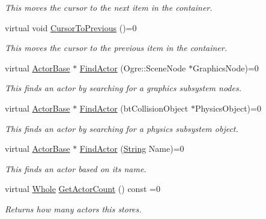 \begin{DoxyCompactItemize}
\begin{DoxyCompactList}\small\item\em This moves the cursor to the next item in the container. \item\end{DoxyCompactList}\item 
virtual void \hyperlink{classMezzanine_1_1ActorContainerBase_a43c40059dc0c99742e99efa68c1acf52}{CursorToPrevious} ()=0
\begin{DoxyCompactList}\small\item\em This moves the cursor to the previous item in the container. \item\end{DoxyCompactList}\item 
virtual \hyperlink{classMezzanine_1_1ActorBase}{ActorBase} $\ast$ \hyperlink{classMezzanine_1_1ActorContainerBase_ace7273ccf53bc37cca7defbd703880f9}{FindActor} (Ogre::SceneNode $\ast$GraphicsNode)=0
\begin{DoxyCompactList}\small\item\em This finds an actor by searching for a graphics subsystem nodes. \item\end{DoxyCompactList}\item 
virtual \hyperlink{classMezzanine_1_1ActorBase}{ActorBase} $\ast$ \hyperlink{classMezzanine_1_1ActorContainerBase_a405caa151d3556786344be12ac0b6c2a}{FindActor} (btCollisionObject $\ast$PhysicsObject)=0
\begin{DoxyCompactList}\small\item\em This finds an actor by searching for a physics subsystem object. \item\end{DoxyCompactList}\item 
virtual \hyperlink{classMezzanine_1_1ActorBase}{ActorBase} $\ast$ \hyperlink{classMezzanine_1_1ActorContainerBase_aafa4b056aaa0161d3d814bfb56bd9ae9}{FindActor} (\hyperlink{namespaceMezzanine_acf9fcc130e6ebf08e3d8491aebcf1c86}{String} Name)=0
\begin{DoxyCompactList}\small\item\em This finds an actor based on its name. \item\end{DoxyCompactList}\item 
virtual \hyperlink{namespaceMezzanine_adcbb6ce6d1eb4379d109e51171e2e493}{Whole} \hyperlink{classMezzanine_1_1ActorContainerBase_a30b3c8d876a51510a8e29043a3c2b9de}{GetActorCount} () const =0
\begin{DoxyCompactList}\small\item\em Returns how many actors this stores. \item\end{DoxyCompactList}\item 

\end{DoxyCompactItemize}

